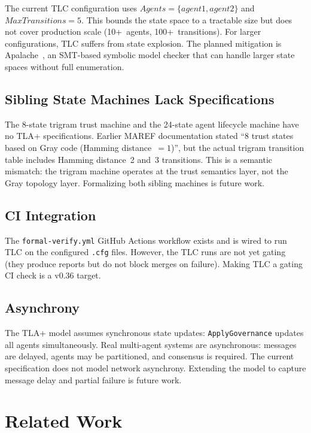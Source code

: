 \documentclass[11pt]{article}
\begin{document}
The current TLC configuration uses
$\mathit{Agents} = \{\textit{agent1}, \textit{agent2}\}$ and
$\mathit{MaxTransitions} = 5$. This bounds the state space to a tractable
size but does not cover production scale (10+~agents, 100+~transitions). For
larger configurations, TLC suffers from state explosion. The planned
mitigation is Apalache~\cite{apalache}, an SMT-based symbolic model checker
that can handle larger state spaces without full enumeration.

\subsection{Sibling State Machines Lack Specifications}

The 8-state trigram trust machine and the 24-state agent lifecycle machine
have no TLA+ specifications. Earlier MAREF documentation stated ``8 trust
states based on Gray code (Hamming distance~$=1$)'', but the actual trigram
transition table includes Hamming distance~2 and~3 transitions. This is a
semantic mismatch: the trigram machine operates at the trust semantics layer,
not the Gray topology layer. Formalizing both sibling machines is future work.

\subsection{CI Integration}

The \texttt{formal-verify.yml} GitHub Actions workflow exists and is wired to
run TLC on the configured \texttt{.cfg} files. However, the TLC runs are not
yet gating (they produce reports but do not block merges on failure). Making
TLC a gating CI check is a v0.36 target.

\subsection{Asynchrony}

The TLA+ model assumes synchronous state updates: \texttt{ApplyGovernance}
updates all agents simultaneously. Real multi-agent systems are asynchronous:
messages are delayed, agents may be partitioned, and consensus is required.
The current specification does not model network asynchrony. Extending the
model to capture message delay and partial failure is future work.

\section{Related Work}
\end{document}
